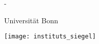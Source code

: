 

{\thispagestyle{empty}
\begin{addmargin}[\UBNcoveroffset]{-\UBNcoveroffset}
  \rmfamily\setlength{\parindent}{0pt}
  \begin{center}
    {\fontsize{44}{50}\selectfont
      Universität Bonn}

    \vspace*{20pt}

    \begin{singlespace}
      \fontsize{30}{40}\selectfont
      \InstituteName
    \end{singlespace}

    \vspace*{40pt}

    \begin{onehalfspace}
      \bfseries\huge
      \thesistitle
    \end{onehalfspace}

    \vspace*{20pt}

    {\huge
      \thesisauthor
    }
  \end{center}

  \vspace*{\fill}

  \thesisabstract

  \vspace*{\fill}

  {\normalfont\normalsize
    \parbox{0.3\textwidth}{\InstituteAddress}
    \parbox{0.4\textwidth}{%
      \centering
      \texttt{[image: instituts\_siegel]}
    }
    \parbox{0.29\textwidth}{%
      \thesisnumber\\
      \thesismonth{} \thesisyear
    }
  }
\end{addmargin}
}
